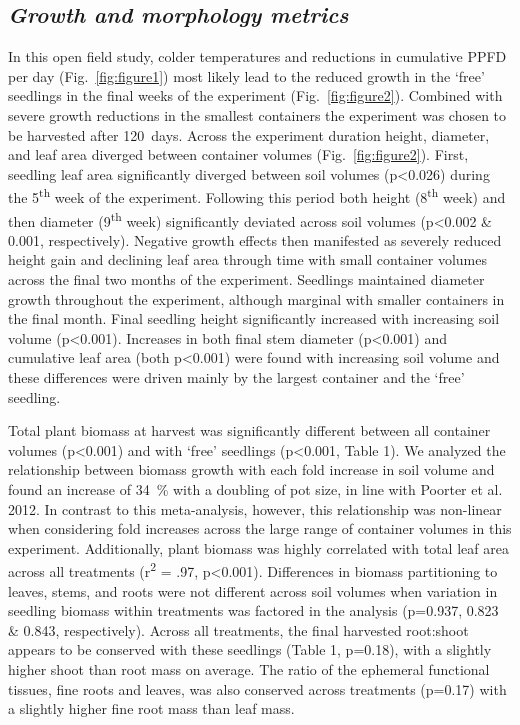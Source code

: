 \documentclass[a4paper]{article}\usepackage[]{graphicx}\usepackage[]{color}
\begin{document}
\subsection*{\textit{Growth and morphology metrics}}
In this open field study, colder temperatures and reductions in cumulative PPFD per day (Fig.~\ref{fig:figure1}) most likely lead to the reduced growth in the ‘free’ seedlings in the final weeks of the experiment (Fig.~\ref{fig:figure2}).  Combined with severe growth reductions in the smallest containers the experiment was chosen to be harvested after 120~days. Across the experiment duration height, diameter, and leaf area diverged between container volumes (Fig.~\ref{fig:figure2}).  First, seedling leaf area significantly diverged between soil volumes (p\textless0.026) during the 5\textsuperscript{th} week of the experiment. Following this period both height (8\textsuperscript{th} week) and then diameter (9\textsuperscript{th} week) significantly deviated across soil volumes (p\textless0.002 \& 0.001, respectively).  Negative growth effects then manifested as severely reduced height gain and declining leaf area through time with small container volumes across the final two months of the experiment. Seedlings maintained diameter growth throughout the experiment, although marginal with smaller containers in the final month. Final seedling height significantly increased with increasing soil volume (p\textless0.001).  Increases in both final stem diameter (p\textless0.001) and cumulative leaf area (both p\textless0.001) were found with increasing soil volume and these differences were driven mainly by the largest container and the ‘free’ seedling.

Total plant biomass at harvest was significantly different between all container volumes (p\textless0.001) and with ‘free’ seedlings (p\textless0.001, Table 1). We analyzed the relationship between biomass growth with each fold increase in soil volume and found an increase of 34~\% with a doubling of pot size, in line with Poorter et al. 2012. In contrast to this meta-analysis, however, this relationship was non-linear when considering fold increases across the large range of container volumes in this experiment.   Additionally, plant biomass was highly correlated with total leaf area across all treatments (r\textsuperscript{2} = .97, p\textless0.001). Differences in biomass partitioning to leaves, stems, and roots were not different across soil volumes when variation in seedling biomass within treatments was factored in the analysis (p=0.937, 0.823 \& 0.843, respectively). Across all treatments, the final harvested root:shoot appears to be conserved with these seedlings (Table 1, p=0.18), with a slightly higher shoot than root mass on average.  The ratio of the ephemeral functional tissues, fine roots and leaves, was also conserved across treatments (p=0.17) with a slightly higher fine root mass than leaf mass. 
\end{document}
